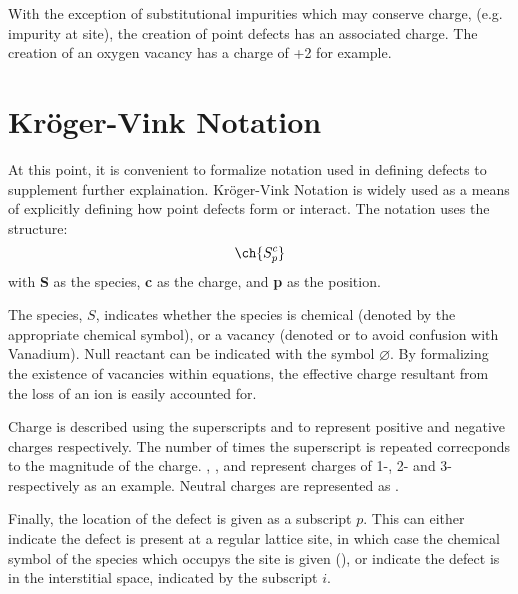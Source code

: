 With the exception of substitutional impurities which may conserve charge, (e.g.  impurity at  site), the creation of point defects has an associated charge. The creation of an oxygen vacancy has a charge of +2 for example.

\newpage
\section{Kr\"oger-Vink Notation}
At this point, it is convenient to formalize notation used in defining defects to supplement further explaination.
Kr\"oger-Vink Notation \citep{Kroger1958} is widely used as a means of explicitly defining how point defects form or interact.
The notation uses the structure: \begin{equation}
\ch{S^c_{p}}
\label{eq:kroger}
\end{equation} with \textbf{S} as the species, \textbf{c} as the charge, and \textbf{p} as the position.

The species, $S$, indicates whether the species is chemical (denoted by the appropriate chemical symbol), or a vacancy (denoted  or  to avoid confusion with Vanadium).
Null reactant can be indicated with the symbol $\varnothing$.
By formalizing the existence of vacancies within equations, the effective charge resultant from the loss of an ion is easily accounted for.

Charge is described using the superscripts  and  to represent positive and negative charges respectively. The number of times the superscript is repeated correcponds to the magnitude of the charge.
, , and  represent charges of 1-, 2- and 3- respectively as an example.
Neutral charges are represented as .

Finally, the location of the defect is given as a subscript $p$.
This can either indicate the defect is present at a regular lattice site, in which case the chemical symbol of the species which occupys the site is given (), or indicate the defect is in the interstitial space, indicated by the subscript $i$.




